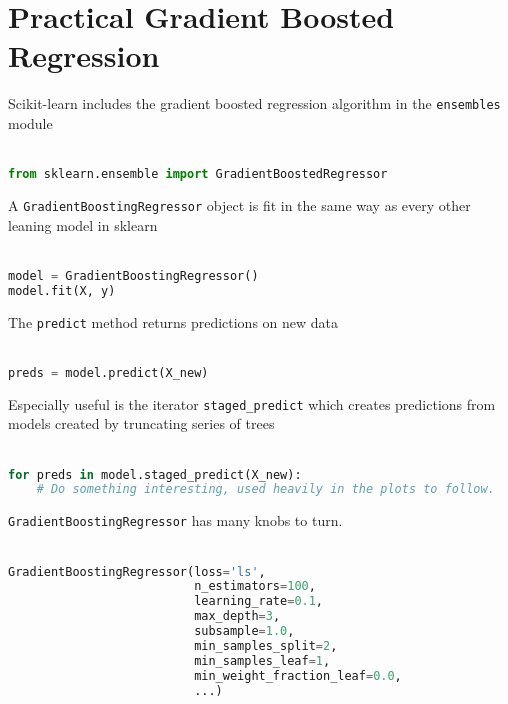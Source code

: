 \section{Practical Gradient Boosted Regression}
%
\begin{frame}[fragile]
Scikit-learn includes the gradient boosted regression algorithm in the \texttt{ensembles} module\\~\\

\begin{lstlisting}[language=python]
from sklearn.ensemble import GradientBoostedRegressor
\end{lstlisting}

\end{frame}
%
\begin{frame}[fragile]
A \texttt{GradientBoostingRegressor} object is fit in the same way as every other leaning model in sklearn\\~\\

\begin{lstlisting}[language=python]
model = GradientBoostingRegressor()
model.fit(X, y)
\end{lstlisting}

\end{frame}
%
\begin{frame}[fragile]
The \texttt{predict} method returns predictions on new data\\~\\

\begin{lstlisting}[language=python]
preds = model.predict(X_new)
\end{lstlisting}

Especially useful is the iterator \texttt{staged\_predict} which creates predictions from models created by truncating series of trees\\~\\

\begin{lstlisting}[language=python]
for preds in model.staged_predict(X_new):
    # Do something interesting, used heavily in the plots to follow.
\end{lstlisting}

\end{frame}
%
\begin{frame}[fragile]

\texttt{GradientBoostingRegressor} has many knobs to turn.\\~\\

\begin{lstlisting}[language=python]
GradientBoostingRegressor(loss='ls',
                          n_estimators=100, 
                          learning_rate=0.1,
                          max_depth=3,
                          subsample=1.0, 
                          min_samples_split=2, 
                          min_samples_leaf=1, 
                          min_weight_fraction_leaf=0.0,
                          ...)
\end{lstlisting}

\end{frame}
